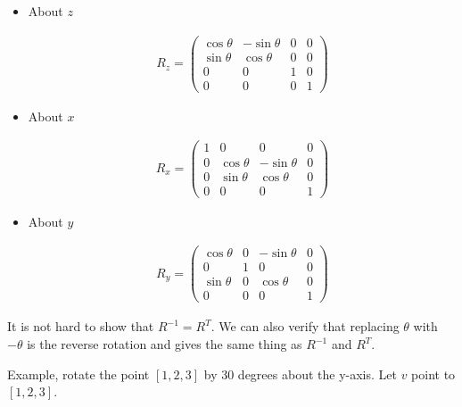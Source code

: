 \begin{itemize}
\item
  About \(z\)

  \[\begin{aligned}
  R_z = \begin{pmatrix}\cos\theta & -\sin\theta & 0 & 0 \\
           \sin\theta & \cos\theta & 0 & 0\\ 0 &0 & 1 & 0 \\
           0& 0& 0& 1 \end{pmatrix}
  \end{aligned}\]
\item
  About \(x\)

  \[\begin{aligned}
  R_x = \begin{pmatrix}1 & 0 & 0 & 0 \\ 0 & \cos\theta & -\sin\theta & 0  \\
           0& \sin\theta & \cos\theta & 0 \\
           0& 0& 0& 1 \end{pmatrix}
  \end{aligned}\]
\item
  About \(y\)

  \[\begin{aligned}
  R_y = \begin{pmatrix}\cos\theta & 0 & -\sin\theta & 0  \\ 0 & 1 & 0 & 0\\
           \sin\theta &0& \cos\theta & 0 \\
           0& 0& 0& 1 \end{pmatrix}
  \end{aligned}\]
\end{itemize}

It is not hard to show that \(R^{-1} = R^T\). We can also verify that
replacing \(\theta\) with \(-\theta\) is the reverse rotation and gives
the same thing as \(R^{-1}\) and \(R^T\).

Example, rotate the point \([1,2,3]\) by 30 degrees about the y-axis.
Let \(v\) point to \([1,2,3]\).

